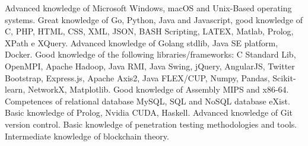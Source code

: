 \documentclass[helvetica,english,logo,notitle,totpages,utf8]{europecv2013}
\begin{document}
\begin{europecv}
{Advanced knowledge of Microsoft Windows, macOS and Unix-Based operating systems. Great knowledge of Go, Python, Java and Javascript, good knowledge of C, PHP, HTML, CSS, XML, JSON, BASH Scripting, LATEX, Matlab, Prolog, XPath e XQuery. Advanced knowledge of Golang stdlib, Java SE platform, Docker. Good knowledge of the following libraries/frameworks: C Standard Lib, OpenMPI, Apache Hadoop, Java RMI, Java Swing, jQuery, AngularJS, Twitter Bootstrap, Express.js, Apache Axis2, Java FLEX/CUP, Numpy, Pandas, Scikit-learn, NetworkX, Matplotlib. Good knowledge of Assembly MIPS and x86-64. Competences of relational database MySQL, SQL and NoSQL database eXist. Basic knowledge of Prolog, Nvidia CUDA, Haskell. Advanced knowledge of Git version control. Basic knowledge of penetration testing methodologies and tools. Intermediate knowledge of blockchain theory.}



\end{europecv}
\end{document}
